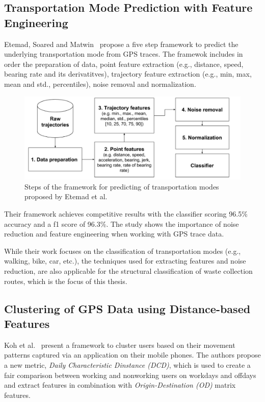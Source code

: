 \documentclass[a4paper,12pt,twoside]{scrreprt}
\begin{document}
\subsection{Transportation Mode Prediction with Feature Engineering}
Etemad, Soared and Matwin~\cite{etemad_predicting_2018} propose a five step
framework to predict the
underlying transportation mode from GPS traces. The framewok
includes in order the preparation of data, point feature extraction (e.g.,
distance, speed, bearing rate and its derivatitves), trajectory feature
extraction (e.g., min, max, mean and std., percentiles), noise removal and
normalization.

\begin{figure}[htbp]
  \centering
  \includegraphics[width=\textwidth]{Figures/related_work/etemad_pipeline.png}
  \caption{Steps of the framework for predicting of transportation
    modes proposed by Etemad et al.~\cite{etemad_predicting_2018}}
  \label{fig:etemad_framework_prediction}
\end{figure}
\FloatBarrier

Their framework achieves competitive results with the
classifier scoring 96.5\% accuracy and a f1 score of 96.3\%. The study shows
the
importance of noise reduction and feature engineering when working with GPS
trace data.~\cite{etemad_predicting_2018}

While their work focuses on the classification of transportation modes (e.g.,
walking, bike, car, etc.), the techniques used for extracting features and
noise reduction, are also applicable for the structural classification of waste
collection routes, which is the focus of this thesis.

\subsection{Clustering of GPS Data using Distance-based Features}
Koh et al.~\cite{koh_clustering_2022} present a framework to cluster users
based on their movement patterns captured via an application on their mobile
phones.
The authors propose a new metric, \textit{Daily Characteristic Dinstance
  (DCD)},
which is used to create a fair comparison between working and nonworking users
on workdays and offdays and extract features in combination with
\textit{Origin-Destination (OD)} matrix features.
\end{document}
